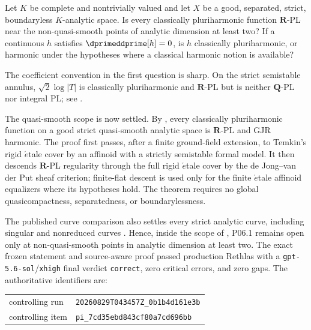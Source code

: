 
\begin{problem}\label{prob:frontier-pluriharmonic}
Let \(K\) be complete and nontrivially valued and let \(X\) be a good,
separated, strict, boundaryless \(K\)-analytic space.  Is every classically
pluriharmonic function \(\mathbf R\)-PL near the non-quasi-smooth points of
analytic dimension at least two?  If a continuous \(h\) satisfies
\(\dprimeddprime[h]=0\), is \(h\) classically pluriharmonic, or harmonic under
the hypotheses where a classical harmonic notion is available?
\end{problem}

The coefficient convention in the first question is sharp.  On the strict
semistable annulus, \(\sqrt{2}\log|T|\) is classically pluriharmonic and
\(\mathbf R\)-PL but is neither \(\mathbf Q\)-PL nor integral PL; see
.

The quasi-smooth scope is now settled.  By
, every classically pluriharmonic function
on a good strict quasi-smooth analytic space is \(\mathbf R\)-PL and GJR
harmonic.  The proof first passes, after a finite ground-field extension, to
Temkin's rigid \(\acute{e}\)tale cover by an affinoid with a strictly
semistable formal model.  It then descends \(\mathbf R\)-PL regularity through
the full rigid \(\acute{e}\)tale cover by the de Jong--van der Put sheaf
criterion; finite-flat descent is used only for the finite
\(\acute{e}\)tale affinoid equalizers where its hypotheses hold.  The theorem
requires no global quasicompactness, separatedness, or boundarylessness.

The published curve comparison also settles every strict analytic curve,
including singular and nonreduced curves
\cite[\S4.1.2 and Proposition~3.15]{GR25Classical}.  Hence, inside the scope
of , P06.1 remains open only at
non-quasi-smooth points in analytic dimension at least two.  The exact frozen statement and
source-aware proof passed production Rethlas with a
\texttt{gpt-5.6-sol}/\texttt{xhigh} final verdict \texttt{correct}, zero
critical errors, and zero gaps.  The authoritative identifiers are:
\begin{center}
\small
\begin{tabular}{@{}ll@{}}
controlling run & \nolinkurl{20260829T043457Z_0b1b4d161e3b}\\
controlling item & \nolinkurl{pi_7cd35ebd843cf80a7cd696bb}
\end{tabular}
\end{center}


